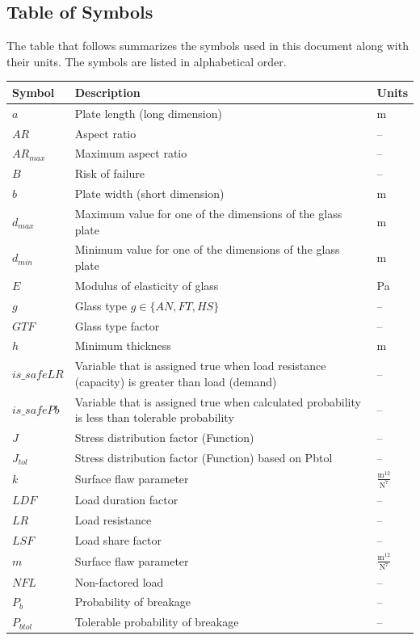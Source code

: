 \documentclass[12pt]{article}
\begin{document}
\subsection{Table of Symbols}
\label{Sec:ToS}
The table that follows summarizes the symbols used in this document along with their units. The symbols are listed in alphabetical order.
\begin{longtabu}{l X[l] l}
\toprule
Symbol & Description & Units
\\
\midrule
$a$ & Plate length (long dimension) & m
\\
$AR$ & Aspect ratio & --
\\
${AR_{max}}$ & Maximum aspect ratio & --
\\
$B$ & Risk of failure & --
\\
$b$ & Plate width (short dimension) & m
\\
${d_{max}}$ & Maximum value for one of the dimensions of the glass plate & m
\\
${d_{min}}$ & Minimum value for one of the dimensions of the glass plate & m
\\
$E$ & Modulus of elasticity of glass & Pa
\\
$g$ & Glass type $g\in{}\{AN,FT,HS\}$ & --
\\
$GTF$ & Glass type factor & --
\\
$h$ & Minimum thickness & m
\\
$is\_safeLR$ & Variable that is assigned true when load resistance (capacity) is greater than load (demand) & --
\\
$is\_safePb$ & Variable that is assigned true when calculated probability is less than tolerable probability & --
\\
$J$ & Stress distribution factor (Function) & --
\\
${J_{tol}}$ & Stress distribution factor (Function) based on Pbtol & --
\\
$k$ & Surface flaw parameter & $\frac{\text{m}^{12}}{\text{N}^{7}}$
\\
$LDF$ & Load duration factor & --
\\
$LR$ & Load resistance & --
\\
$LSF$ & Load share factor & --
\\
$m$ & Surface flaw parameter & $\frac{\text{m}^{12}}{\text{N}^{7}}$
\\
$NFL$ & Non-factored load & --
\\
${P_{b}}$ & Probability of breakage & --
\\
${P_{btol}}$ & Tolerable probability of breakage & --

\end{longtabu}
\end{document}
